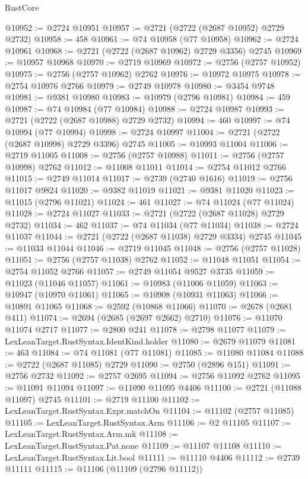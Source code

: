 \begin{lexlean}{RustCore}
\begin{coremodule}
@10952 := @2724 @10951
@10957 := @2721 (@2722 (@2687 @10952) @2729 @2732)
@10958 := 458
@10961 := @74 @10958 (@77 @10958)
@10962 := @2724 @10961
@10968 := @2721 (@2722 (@2687 @10962) @2729 @3356) @2745
@10969 := @10957 @10968
@10970 := @2719 @10969
@10972 := @2756 (@2757 @10952)
@10975 := @2756 (@2757 @10962) @2762
@10976 := @10972 @10975
@10978 := @2754 @10976 @2766
@10979 := @2749 @10978
@10980 := @3454 @9748
@10981 := @9381 @10980
@10983 := @10979 (@2796 @10981)
@10984 := 459
@10987 := @74 @10984 (@77 @10984)
@10988 := @2724 @10987
@10993 := @2721 (@2722 (@2687 @10988) @2729 @2732)
@10994 := 460
@10997 := @74 @10994 (@77 @10994)
@10998 := @2724 @10997
@11004 := @2721 (@2722 (@2687 @10998) @2729 @3396) @2745
@11005 := @10993 @11004
@11006 := @2719 @11005
@11008 := @2756 (@2757 @10988)
@11011 := @2756 (@2757 @10998) @2762
@11012 := @11008 @11011
@11014 := @2754 @11012 @2766
@11015 := @2749 @11014
@11017 := @2739 (@2740 @1616)
@11019 := @2756 @11017 @9824
@11020 := @9382 @11019
@11021 := @9381 @11020
@11023 := @11015 (@2796 @11021)
@11024 := 461
@11027 := @74 @11024 (@77 @11024)
@11028 := @2724 @11027
@11033 := @2721 (@2722 (@2687 @11028) @2729 @2732)
@11034 := 462
@11037 := @74 @11034 (@77 @11034)
@11038 := @2724 @11037
@11044 := @2721 (@2722 (@2687 @11038) @2729 @3334) @2745
@11045 := @11033 @11044
@11046 := @2719 @11045
@11048 := @2756 (@2757 @11028)
@11051 := @2756 (@2757 @11038) @2762
@11052 := @11048 @11051
@11054 := @2754 @11052 @2766
@11057 := @2749 @11054 @9527 @3735
@11059 := @11023 (@11046 @11057)
@11061 := @10983 (@11006 @11059)
@11063 := @10947 (@10970 @11061)
@11065 := @10908 (@10931 @11063)
@11066 := @10891 @11065
@11068 := @2592 (@10868 @11066)
@11070 := @2678 (@2681 @411)
@11074 := @2694 (@2685 (@2697 @2662) @2710)
@11076 := @11070 @11074 @2717
@11077 := @2800 @241
@11078 := @2798 @11077
@11079 := LexLeanTarget.RustSyntax.IdentKind.holder
@11080 := @2679 @11079
@11081 := 463
@11084 := @74 @11081 (@77 @11081)
@11085 := @11080 @11084
@11088 := @2722 (@2687 @11085) @2729
@11090 := @2750 (@2896 @151)
@11091 := @2756 @2732
@11092 := @2757 @2695
@11094 := @2756 @11092 @2762
@11095 := @11091 @11094
@11097 := @11090 @11095 @4406
@11100 := @2721 (@11088 @11097) @2745
@11101 := @2719 @11100
@11102 := LexLeanTarget.RustSyntax.Expr.matchOn
@11104 := @11102 (@2757 @11085)
@11105 := LexLeanTarget.RustSyntax.Arm
@11106 := @2 @11105
@11107 := LexLeanTarget.RustSyntax.Arm.mk
@11108 := LexLeanTarget.RustSyntax.Pat.none
@11109 := @11107 @11108
@11110 := LexLeanTarget.RustSyntax.Lit.bool
@11111 := @11110 @4406
@11112 := @2739 @11111
@11115 := @11106 (@11109 (@2796 @11112))

\end{coremodule}
\end{lexlean}
